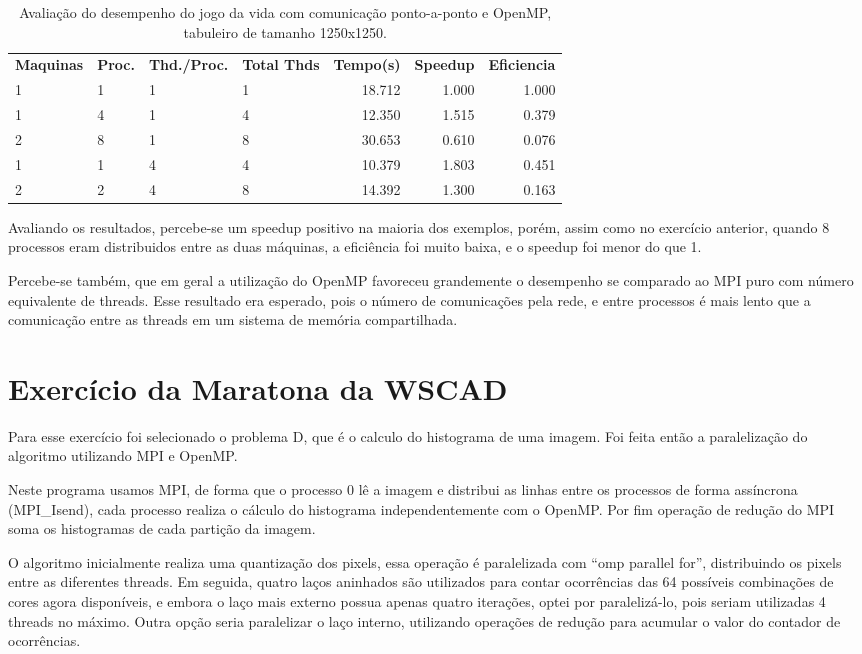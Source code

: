 \documentclass[conference]{IEEEtran}
\begin{document}
\begin{table}[htb!]
  \centering
	\begin{adjustbox}{max width=\linewidth}
	\begin{tabular}{llllrrr}%
		\bfseries Maquinas & \bfseries Proc. & \bfseries Thd./Proc. & \bfseries Total Thds & \bfseries Tempo(s) & \bfseries Speedup & \bfseries Eficiencia \\
    1	& 1	& 1	& 1	& 18.712 & 1.000 & 1.000 \\
    1	& 4	& 1	& 4	& 12.350 & 1.515 & 0.379 \\
    2	& 8	& 1	& 8	& 30.653 & 0.610 & 0.076 \\
    1	& 1	& 4	& 4	& 10.379 & 1.803 & 0.451 \\
    2	& 2	& 4	& 8	& 14.392 & 1.300 & 0.163 \\
	\end{tabular}
	\end{adjustbox}
	\caption{\label{tab:ex03}Avaliação do desempenho do jogo da vida com comunicação ponto-a-ponto e OpenMP, tabuleiro de tamanho 1250x1250.}
\end{table}

Avaliando os resultados, percebe-se um speedup positivo na maioria dos exemplos, porém, assim como no exercício anterior, quando 8 processos eram distribuidos entre as duas máquinas, a eficiência foi muito baixa, e o speedup foi menor do que 1.

Percebe-se também, que em geral a utilização do OpenMP favoreceu grandemente o desempenho se comparado ao MPI puro com número equivalente de threads. Esse resultado era esperado, pois o número de comunicações pela rede, e entre processos é mais lento que a comunicação entre as threads em um sistema de memória compartilhada.

\section{Exercício da Maratona da WSCAD}
Para esse exercício foi selecionado o problema D, que é o calculo do histograma de uma imagem. Foi feita então a paralelização do algoritmo utilizando MPI e OpenMP.

Neste programa usamos MPI, de forma que o processo 0 lê a imagem e distribui as linhas entre os processos de forma assíncrona (MPI_Isend), cada processo realiza o cálculo do histograma independentemente com o OpenMP. Por fim operação de redução do MPI soma os histogramas de cada partição da imagem.

O algoritmo inicialmente realiza uma quantização dos pixels, essa operação é paralelizada com ``omp parallel for'', distribuindo os pixels entre as diferentes threads.
Em seguida, quatro laços aninhados são utilizados para contar ocorrências das 64 possíveis combinações de cores agora disponíveis, e embora o laço mais externo possua apenas quatro iterações, optei por paralelizá-lo, pois seriam utilizadas 4 threads no máximo.
Outra opção seria paralelizar o laço interno, utilizando operações de redução para acumular o valor do contador de ocorrências.
\end{document}
